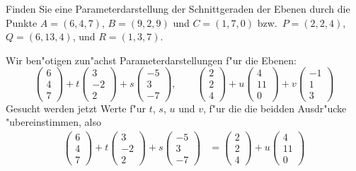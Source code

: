 Finden Sie eine Parameterdarstellung der Schnittgeraden der Ebenen
durch die Punkte $A=(6,4,7)$, $B=(9,2,9)$ und $C=(1,7,0)$ bzw.~$P=(2,2,4)$,
$Q=(6,13,4)$, und $R=(1,3,7)$.

\begin{loesung}
Wir ben"otigen zun"achst Parameterdarstellungen f"ur die Ebenen:
\[
\begin{pmatrix}6\\4\\7\end{pmatrix}
+t
\begin{pmatrix}3\\-2\\2\end{pmatrix}
+s
\begin{pmatrix}-5\\3\\-7\end{pmatrix}
,\qquad
\begin{pmatrix}2\\2\\4\end{pmatrix}
+u
\begin{pmatrix}4\\11\\0\end{pmatrix}
+v
\begin{pmatrix}-1\\1\\3\end{pmatrix}
\]
Gesucht werden jetzt Werte f"ur $t$, $s$, $u$ und $v$, f"ur die
die beidden Ausdr"ucke "ubereinstimmen, also
\begin{align*}
\begin{pmatrix}6\\4\\7\end{pmatrix}
+t
\begin{pmatrix}3\\-2\\2\end{pmatrix}
+s
\begin{pmatrix}-5\\3\\-7\end{pmatrix}
&=
\begin{pmatrix}2\\2\\4\end{pmatrix}
+u
\begin{pmatrix}4\\11\\0\end{pmatrix}

\end{align*}
\end{loesung}
